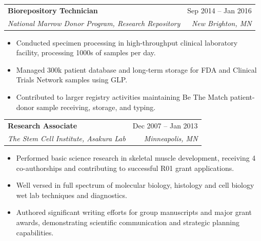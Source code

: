 \documentclass[letterpaper,11pt]{article}
\makeatletter
\newcommand{\resumeItem}[1]{
  \item\small{
    {#1 \vspace{-2pt}}
  }
}
\newcommand{\resumeSubheading}[4]{
  \vspace{-2pt}\item
    \begin{tabular*}{0.97\textwidth}[t]{l@{\extracolsep{\fill}}r}
      \textbf{#1} & #2 \\
      \textit{\small#3} & \textit{\small #4} \\
    \end{tabular*}\vspace{-7pt}
}
\newcommand{\resumeItemListStart}{\begin{itemize}}
\newcommand{\resumeItemListEnd}{\end{itemize}\vspace{-5pt}}
\makeatother
\begin{document}
    \resumeSubheading
      {Biorepository Technician}{Sep 2014 -- Jan 2016}
      {National Marrow Donor Program, Research Repository}{New Brighton, MN}
      \resumeItemListStart
        \resumeItem{Conducted specimen processing in high-throughput clinical laboratory facility, processing 1000s of samples per day.}
        \resumeItem{Managed 300k patient database and long-term storage for FDA and Clinical Trials Network samples using GLP.}
        \resumeItem{Contributed to larger registry activities maintaining Be The Match patient-donor sample receiving, storage, and typing.}
      \resumeItemListEnd

%    

    \resumeSubheading
      {Research Associate}{Dec 2007 -- Jan 2013}
      {The Stem Cell Institute, Asakura Lab}{Minneapolis, MN}
      \resumeItemListStart
        \resumeItem{Performed basic science research in skeletal muscle development, receiving 4 co-authorships and contributing to successful R01 grant applications.}
        \resumeItem{Well versed in full spectrum of molecular biology, histology and cell biology wet lab techniques and diagnostics.}
        \resumeItem{Authored significant writing efforts for group manuscripts and major grant awards, demonstrating scientific communication and strategic planning capabilities.}
      \resumeItemListEnd
\end{document}
